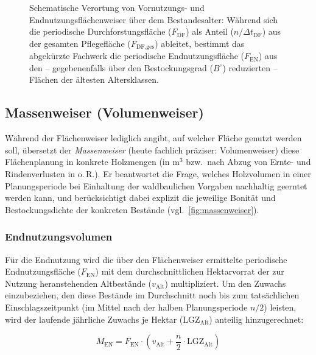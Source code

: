 \documentclass[twocolumn, paper=a4, fontsize=10pt]{scrartcl}
\begin{document}
\begin{figure}[!htbp]
  \caption{Schematische Verortung von Vornutzungs- und Endnutzungsflächenweiser über dem Bestandesalter: Während sich die periodische Durchforstungsfläche ($F_{\text{DF}}$) als Anteil ($n/\Delta t_{\text{DF}}$) aus der gesamten Pflegefläche ($F_{\text{DF,ges}}$) ableitet, bestimmt das abgekürzte Fachwerk die periodische Endnutzungsfläche ($F_{\text{EN}}$) aus den -- gegebenenfalls über den Bestockungsgrad ($B^\circ$) reduzierten -- Flächen der ältesten Altersklassen.}
  \label{fig:flaechenweiser}
\end{figure}

\subsection{Massenweiser (Volumenweiser)}

Während der Flächenweiser lediglich angibt, auf welcher Fläche genutzt werden soll, übersetzt der \emph{Massenweiser} (heute fachlich präziser: Volumenweiser) diese Flächenplanung in konkrete Holzmengen (in $\text{m}^3$ bzw.\ nach Abzug von Ernte- und Rindenverlusten in \si{\Efm} o.\,R.). Er beantwortet die Frage, welches Holzvolumen in einer Planungsperiode bei Einhaltung der waldbaulichen Vorgaben nachhaltig geerntet werden kann, und berücksichtigt dabei explizit die jeweilige Bonität und Bestockungsdichte der konkreten Bestände (vgl.\ \cref{fig:massenweiser}).

\subsubsection{Endnutzungsvolumen}

Für die Endnutzung wird die über den Flächenweiser ermittelte periodische Endnutzungsfläche ($F_{\text{EN}}$) mit dem durchschnittlichen Hektarvorrat der zur Nutzung heranstehenden Altbestände ($v_{\text{Alt}}$) multipliziert. Um den Zuwachs einzubeziehen, den diese Bestände im Durchschnitt noch bis zum tatsächlichen Einschlagszeitpunkt (im Mittel nach der halben Planungsperiode $n/2$) leisten, wird der laufende jährliche Zuwachs je Hektar ($\text{LGZ}_{\text{Alt}}$) anteilig hinzugerechnet:

\begin{equation}
    \label{eq:men_flaeche}
    M_{\text{EN}} = F_{\text{EN}} \cdot \left( v_{\text{Alt}} + \frac{n}{2} \cdot \text{LGZ}_{\text{Alt}} \right)
\end{equation}
\end{document}
